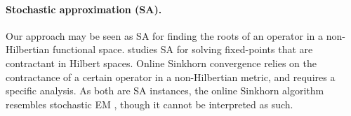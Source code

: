\paragraph{Stochastic approximation (SA).} Our approach may be seen as SA \cite{robbins1951stochastic} for finding the roots of an
operator in a non-Hilbertian functional space. \cite{alber_stochastic_2012} studies
SA for solving fixed-points that are contractant in Hilbert spaces. Online Sinkhorn convergence relies on the contractance of a certain operator in a non-Hilbertian metric, and requires a specific analysis. 
As both are SA instances, the online Sinkhorn algorithm resembles stochastic EM \cite{celeux_stochastic_1992}, though it cannot be interpreted as such.